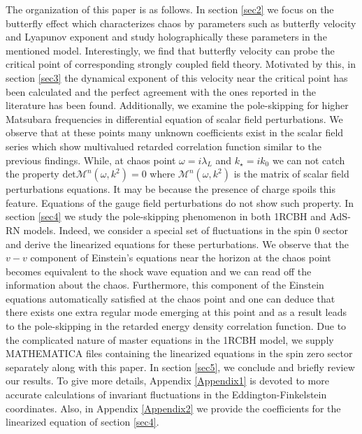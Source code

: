 \documentclass[preprintnumbers,aps,prd,longbibliography,nofootinbib,nobibnotes,amsmath,amssymb]{revtex4}
\begin{document}
The organization of this paper is as follows. In section \ref{sec2} we focus on the butterfly effect which characterizes chaos by parameters such as butterfly velocity and Lyapunov exponent and study holographically these parameters in the mentioned model. Interestingly, we find that butterfly velocity can probe the critical point of corresponding strongly coupled field theory. Motivated by this, in section \ref{sec3}  the dynamical exponent of this velocity near the critical point has been calculated  and the perfect agreement with the ones reported in the literature has been found. Additionally, we examine the pole-skipping for higher Matsubara frequencies in differential equation of scalar field perturbations. We observe that at these points many unknown coefficients exist in the scalar field series which show multivalued retarded correlation function similar to the previous findings. While, at chaos point $\omega = i \lambda_{L}$ and $k_\star = i k_0$ we can not catch the property $\mbox{det} \mathcal{M}^n(\omega, k^2)=0$ where $\mathcal{M}^n(\omega, k^2)$ is the matrix of scalar field perturbations equations. It may be because the presence of charge  spoils this feature. Equations of the gauge field perturbations do not show such property. In section \ref{sec4} we study the pole-skipping phenomenon in both 1RCBH  and AdS-RN models. Indeed, we consider  a special set of fluctuations in the spin 0 sector and derive the linearized equations for these perturbations. We observe that the $v-v$ component of Einstein’s equations  near the horizon at the chaos point  becomes equivalent to the shock wave equation and we can read off the information about the chaos.  Furthermore, this component of the Einstein equations automatically satisfied at  the chaos point and one can deduce that there exists one extra regular mode emerging at this point and as a result leads to the pole-skipping in the retarded energy density correlation function.  Due to the complicated nature of master equations in the 1RCBH model, we supply MATHEMATICA files containing the linearized equations in the spin zero sector  separately along with this paper. In section \ref{sec5}, we conclude and briefly review  our results. To give more details, Appendix \ref{Appendix1} is devoted to more accurate calculations of invariant fluctuations in the Eddington-Finkelstein coordinates.  Also, in Appendix \ref{Appendix2} we provide the coefficients for  the linearized equation  of section \ref{sec4}.
\end{document}
